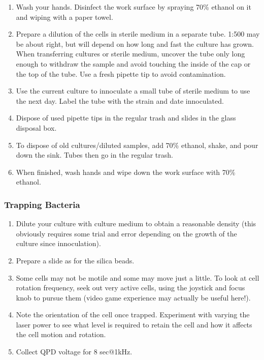 \documentclass{../lab}
\begin{document}
\begin{enumerate}
    \item Wash your hands. Disinfect the work surface by spraying 70\% ethanol on it and wiping with a paper towel.

    \item Prepare a dilution of the cells in sterile medium in a separate tube. 1:500 may be about right, but will depend on how long and fast the culture has grown. When transferring cultures or sterile medium, uncover the tube only long enough to withdraw the sample and avoid touching the inside of the cap or the top of the tube. Use a fresh pipette tip to avoid contamination.

    \item Use the current culture to innoculate a small tube of sterile medium to use the next day. Label the tube with the strain and date innoculated.

    \item Dispose of used pipette tips in the regular trash and slides in the glass disposal box.

    \item To dispose of old cultures/diluted samples, add 70\% ethanol, shake, and pour down the sink. Tubes then go in the regular trash.

    \item When finished, wash hands and wipe down the work surface with 70\% ethanol.

\end{enumerate}

\subsubsection{Trapping Bacteria}

\begin{enumerate}
    \item Dilute your culture with culture medium to obtain a reasonable density (this obviously requires some trial and error depending on the growth of the culture since innoculation).

    \item Prepare a slide as for the silica beads.

    \item Some cells may not be motile and some may move just a little. To look at cell rotation frequency, seek out very active cells, using the joystick and focus knob to pursue them (video game experience may actually be useful here!).

    \item Note the orientation of the cell once trapped. Experiment with varying the laser power to see what level is required to retain the cell and how it affects the cell motion and rotation.

    \item Collect QPD voltage for 8 sec@1kHz.

\end{enumerate}
\end{document}
